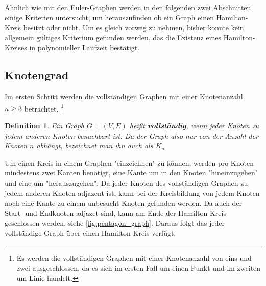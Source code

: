 \documentclass{article}
\newtheorem{mydef}{Definition}
\begin{document}
Ähnlich wie mit den Euler-Graphen werden in den folgenden zwei Abschnitten einige Kriterien untersucht, um herauszufinden ob ein Graph einen Hamilton-Kreis besitzt oder nicht. Um es gleich vorweg zu nehmen, bisher konnte kein allgemein gültiges Kriterium gefunden werden, das die Existenz eines Hamilton-Kreises in polynomieller Laufzeit bestätigt.

%
%
\subsection{Knotengrad}

Im ersten Schritt werden die vollständigen Graphen mit einer Knotenanzahl $n \geq 3$ betrachtet. \footnote{Es werden die vollständigen Graphen mit einer Knotenanzahl von eins und zwei ausgeschlossen, da es sich im ersten Fall um einen Punkt und im zweiten um Linie handelt.}

\begin{mydef}
	Ein Graph $G=(V,E)$ heißt \textbf{vollständig}, wenn jeder Knoten zu jedem anderen Knoten benachbart ist. Da der Graph also nur von der Anzahl der Knoten $n$ abhängt, bezeichnet man ihn auch als $K_n$. \cite{busing2010graphen}
\end{mydef}

Um einen Kreis in einem Graphen "einzeichnen" zu können, werden pro Knoten mindestens zwei Kanten benötigt, eine Kante um in den Knoten "hineinzugehen" und eine um "herauszugehen". Da jeder Knoten des vollständigen Graphen zu jedem anderen Knoten adjazent ist, kann bei der Kreisbildung von jedem Knoten noch eine Kante zu einem unbesucht Knoten gefunden werden. Da auch der Start- und Endknoten adjazet sind, kann am Ende der Hamilton-Kreis geschlossen werden, siehe \autoref{fig:pentagon_graph}.
Daraus folgt das jeder vollständige Graph über einen Hamilton-Kreis verfügt.
\end{document}
